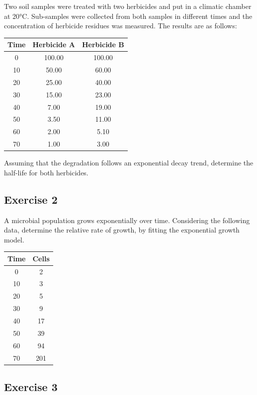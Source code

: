 \documentclass[a4paper,12pt,oneside]{book}
\begin{document}
Two soil samples were treated with two herbicides and put in a climatic chamber at 20°C. Sub-samples were collected from both samples in different times and the concentration of herbicide residues was measured. The results are as follows:

\begin{longtable}[]{@{}ccc@{}}
\toprule
Time & Herbicide A & Herbicide B \\
\midrule
\endhead
0 & 100.00 & 100.00 \\
10 & 50.00 & 60.00 \\
20 & 25.00 & 40.00 \\
30 & 15.00 & 23.00 \\
40 & 7.00 & 19.00 \\
50 & 3.50 & 11.00 \\
60 & 2.00 & 5.10 \\
70 & 1.00 & 3.00 \\
\bottomrule
\end{longtable}

Assuming that the degradation follows an exponential decay trend, determine the half-life for both herbicides.

\hypertarget{exercise-2-8}{%
\subsection{Exercise 2}\label{exercise-2-8}}

A microbial population grows exponentially over time. Considering the following data, determine the relative rate of growth, by fitting the exponential growth model.

\begin{longtable}[]{@{}cc@{}}
\toprule
Time & Cells \\
\midrule
\endhead
0 & 2 \\
10 & 3 \\
20 & 5 \\
30 & 9 \\
40 & 17 \\
50 & 39 \\
60 & 94 \\
70 & 201 \\
\bottomrule
\end{longtable}

\hypertarget{exercise-3-7}{%
\subsection{Exercise 3}\label{exercise-3-7}}
\end{document}
